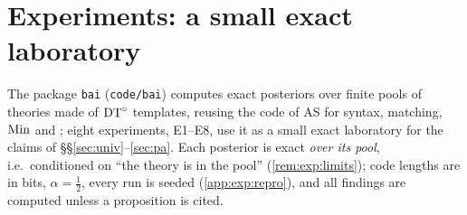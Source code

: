 \providecommand{\expbrk}{\hfil\penalty0\hfilneg}
\providecommand{\expth}[1]{\textsf{#1}}
\providecommand{\expgen}[1]{\textit{#1}}
\providecommand{\crefabbrev}{}

\section{Experiments: a small exact laboratory}\label{sec:exp}
\suppressfloats[t]%

The package \texttt{bai} (\texttt{code/bai}) computes exact posteriors over finite pools of theories made of $\mathrm{DT}^{\circ}$ templates, reusing the code of AS \citep{claude2026axiomschemas} for syntax, matching, $\mathrm{Min}$ and \DTRC; eight experiments, E1--E8, use it as a small exact laboratory for the claims of \S\S\ref{sec:univ}--\ref{sec:pa}. Each posterior is exact \emph{over its pool}, i.e.\ conditioned on ``the theory is in the pool'' (\cref{rem:exp:limits}); code lengths are in bits, $\alpha=\tfrac12$, every run is seeded (\cref{app:exp:repro}), and all findings are computed unless a proposition is cited.

